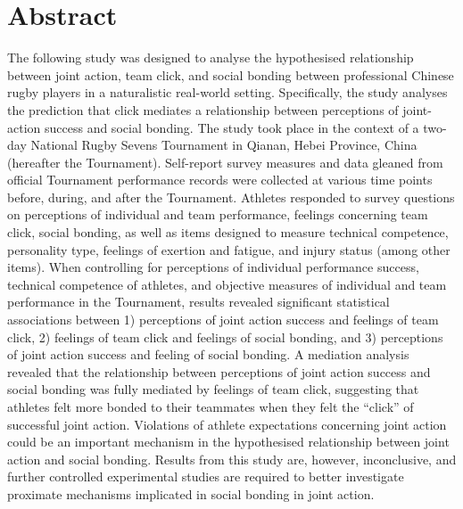 \section{Abstract}
The following study was designed to analyse the hypothesised relationship between joint action, team click, and social bonding between professional Chinese rugby players in a naturalistic real-world setting.  Specifically, the study analyses the prediction that click mediates a relationship between perceptions of joint-action success and social bonding.  The study took place in the context of a two-day National Rugby Sevens Tournament in Qianan, Hebei Province, China (hereafter the Tournament).  Self-report survey measures and data gleaned from official Tournament performance records were collected at various time points before, during, and after the Tournament.  Athletes responded to survey questions on perceptions of individual and team performance, feelings concerning team click, social bonding, as well as items designed to measure technical competence, personality type, feelings of exertion and fatigue, and injury status (among other items). When controlling for perceptions of individual performance success, technical competence of athletes, and objective measures of individual and team performance in the Tournament, results revealed significant statistical associations between 1) perceptions of joint action success and feelings of team click, 2) feelings of team click and feelings of social bonding, and 3) perceptions of joint action success and feeling of social bonding.  A mediation analysis revealed that the relationship between perceptions of joint action success and social bonding was fully mediated by feelings of team click, suggesting that athletes felt more bonded to their teammates when they felt the ``click'' of successful joint action.  Violations of athlete expectations concerning joint action could be an important mechanism in the hypothesised relationship between joint action and social bonding. Results from this study are, however, inconclusive, and further controlled experimental studies are required to better investigate proximate mechanisms implicated in social bonding in joint action.


